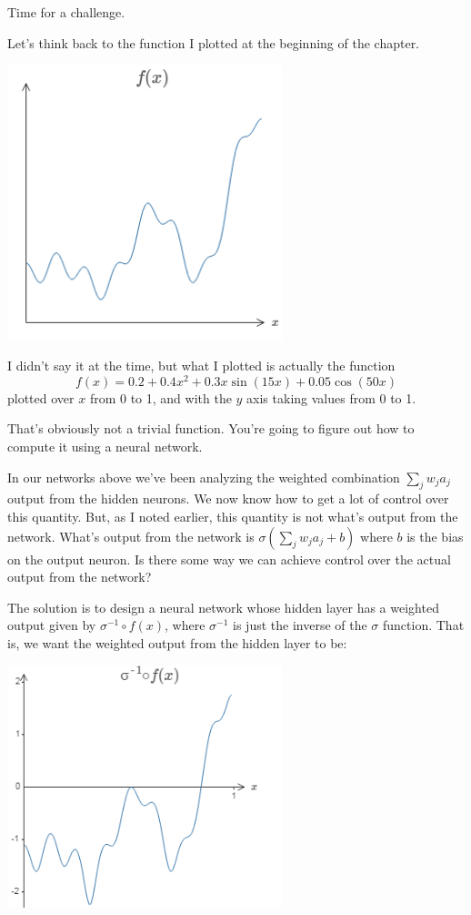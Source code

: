 Time for a challenge.

Let's think back to the function I plotted at the beginning of the chapter.

{\centering \includegraphics[width=0.6\textwidth,]{pic/wigglyfn17} \par}

I didn't say it at the time, but what I plotted is actually the function 
\begin{equation}
f(x)=0.2+0.4x^2+0.3 x \sin(15x)+0.05\cos(50x)
\label{eq:wigglyequan113}
\end{equation}
plotted over $x$ from 0 to 1, and with the $y$ axis taking values from 0 to 1.

That's obviously not a trivial function.
You're going to figure out how to compute it using a neural network.

In our networks above we've been analyzing the weighted combination $\sum_j w_ja_j$
output from the hidden neurons. We now know how to get a lot of control over this quantity. But, as I noted earlier, this quantity is not what's output from the network. What's output from the network is $\sigma(\sum_j w_ja_j + b)$ where $b$
is the bias on the output neuron. Is there some way we can achieve control over the actual output from the network?

The solution is to design a neural network whose hidden layer has a weighted output given by $\sigma^{-1}\circ f(x)$, where $\sigma^{-1}$ is just the inverse of the $\sigma$
function. That is, we want the weighted output from the hidden layer to be:

{\centering \includegraphics[width=0.6\textwidth,]{pic/wigglyfn18} \par}

